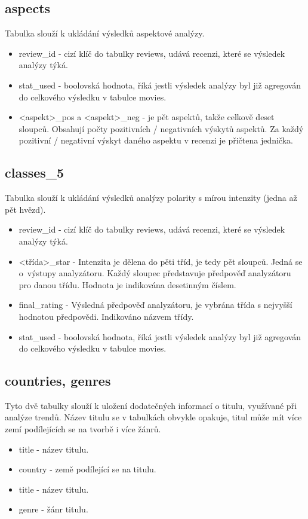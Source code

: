 \subsection{aspects}
Tabulka slouží k ukládání výsledků aspektové analýzy.
\begin{itemize}
    \item review\_id - cizí klíč do tabulky reviews, udává recenzi, které se výsledek analýzy týká.
    \item stat\_used - boolovská hodnota, říká jestli výsledek analýzy byl již agregován do celkového výsledku v tabulce movies.
    \item <aspekt>\_pos a <aspekt>\_neg - je pět aspektů, takže celkově deset sloupců. Obsahují počty pozitivních / negativních výskytů aspektů. Za každý pozitivní / negativní výskyt daného aspektu v recenzi je přičtena jednička. 
\end{itemize}

\subsection{classes\_5}
Tabulka slouží k ukládání výsledků analýzy polarity s mírou intenzity (jedna až pět hvězd).
\begin{itemize}
    \item review\_id - cizí klíč do tabulky reviews, udává recenzi, které se výsledek analýzy týká.
    \item <třída>\_star - Intenzita je dělena do pěti tříd, je tedy pět sloupců. Jedná se o~výstupy analyzátoru. Každý sloupec představuje předpověď analyzátoru pro danou třídu. Hodnota je indikována desetinným číslem.
    \item final\_rating - Výsledná předpověď analyzátoru, je vybrána třída s nejvyšší hodnotou předpovědi. Indikováno názvem třídy.
    \item stat\_used - boolovská hodnota, říká jestli výsledek analýzy byl již agregován do celkového výsledku v tabulce movies.
\end{itemize}

\subsection{countries, genres}
Tyto dvě tabulky slouží k uložení dodatečných informací o titulu, využívané při analýze trendů. Název titulu se v tabulkách obvykle opakuje, titul může mít více zemí podílejících se na tvorbě i více žánrů.
\begin{itemize}
    \item title - název titulu.
    \item country - země podílející se na titulu.
\end{itemize}
\begin{itemize}
    \item title - název titulu.
    \item genre - žánr titulu.
\end{itemize}

